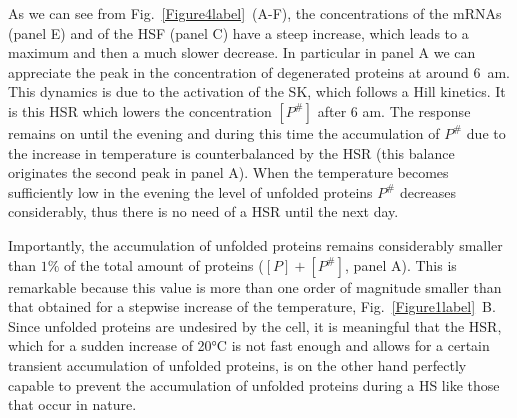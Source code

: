 \documentclass[oneside, 10pt, a4paper, twocolumn]{article}
\begin{document}
As we can see from Fig.~\ref{Figure4label}~(A-F), the concentrations of the mRNAs (panel E) and of the HSF (panel C) have a steep increase, which leads to a maximum and then a much slower decrease. In particular in panel A we can appreciate the peak in the concentration of degenerated proteins at around 6~am. This {dynamics} is due to the activation of the SK, which follows a Hill kinetics. It is this HSR which lowers the concentration $\left[P^\#\right]$ after 6 am. The response remains on until the evening and during this time the accumulation of $P^\#$  due to the increase in temperature is counterbalanced by the HSR (this balance originates the second peak in panel A). When the temperature becomes sufficiently low in the {evening the level of unfolded proteins $P^\#$ decreases considerably, thus there is no need of a HSR until the next day. }

{Importantly, the accumulation of unfolded proteins remains considerably smaller than $1\%$ of the total amount of 
proteins ($\left[P\right]+\left[P^\#\right]$, panel A). This is remarkable because this value is more than one order of magnitude smaller than
that obtained for a stepwise increase of the temperature, Fig.~\ref{Figure1label}~B.} Since unfolded proteins are undesired by the cell, it is meaningful that the HSR, which for a sudden increase of 20°C is not fast enough and allows for a certain transient accumulation of unfolded proteins, is on the other hand perfectly capable to prevent the accumulation of unfolded proteins during a HS like those that occur in nature. 
\end{document}
